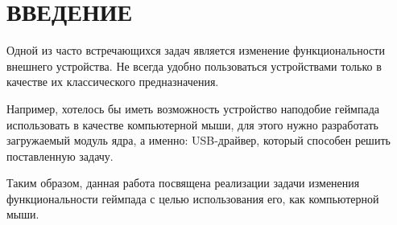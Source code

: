\section*{ВВЕДЕНИЕ}
	Одной из часто встречающихся задач является изменение функциональности внешнего устройства. Не всегда удобно пользоваться устройствами только в качестве их классического предназначения.\par
	Например, хотелось бы иметь возможность устройство наподобие геймпада использовать в качестве компьютерной мыши, для этого нужно разработать загружаемый модуль ядра, а именно: USB-драйвер, который способен решить поставленную задачу.\par
	
	
	Таким образом, данная работа посвящена реализации задачи изменения функциональности геймпада с целью использования его, как компьютерной мыши.

	
	
	
\pagebreak